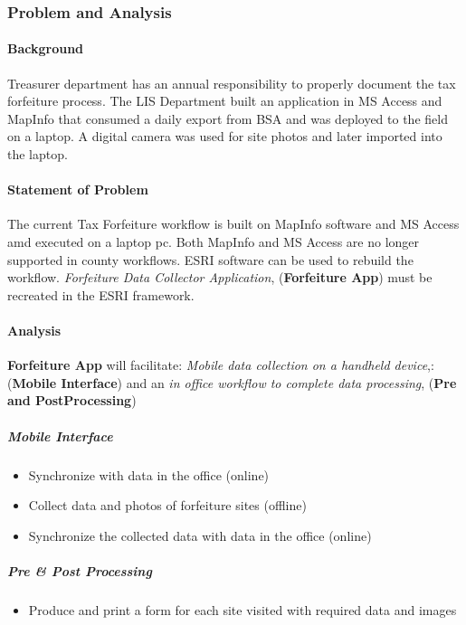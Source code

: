 \subsubsection{Problem and Analysis}
\begin{adjmulticols}{2}{\innerMar}{\outerMar}
\paragraph{Background}
\noindent Treasurer department has an annual responsibility to properly document the tax forfeiture process.  The LIS Department built an application in MS Access and MapInfo that consumed a daily export from BSA and was deployed to the field on a laptop.  A digital camera was used for site photos and later imported into the laptop.
\paragraph{Statement of Problem}
\noindent The current Tax Forfeiture workflow is built on MapInfo software and MS Access amd executed on a laptop pc.  Both MapInfo and MS Access are no longer supported in county workflows.  ESRI software can be used to rebuild the workflow.  \textit{Forfeiture Data Collector Application}, (\textbf{Forfeiture App}) must be recreated in the ESRI framework.
\paragraph{Analysis}
\noindent \textbf{Forfeiture App} will facilitate: \textit{Mobile data collection on a handheld device},: (\textbf{Mobile Interface}) and an
\textit{in office workflow to complete data processing}, (\textbf{Pre and PostProcessing})
\subparagraph*{Mobile Interface}
\begin{itemize} %
\item Synchronize with data in the office (online)
\item Collect data and photos of forfeiture sites (offline)
\item Synchronize the collected data with data in the office (online)
\end{itemize} %
\subparagraph*{Pre \& Post Processing}
\begin{itemize} %
\item Produce and print a form for each site visited with required data and images
\end{itemize} %
\end{adjmulticols}
\clearpage
